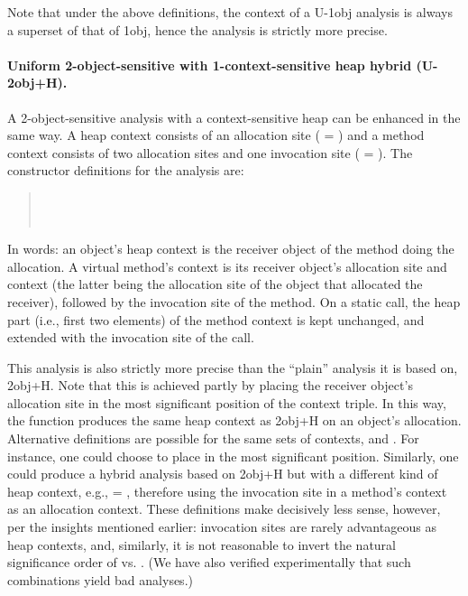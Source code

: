 Note that under the above definitions, the context of a U-1obj
analysis is always a superset of that of 1obj, hence the analysis is
strictly more precise.

\paragraph{Uniform 2-object-sensitive with 1-context-sensitive heap hybrid (U-2obj+H).}

A 2-object-sensitive analysis with a context-sensitive heap can be
enhanced in the same way. A heap context consists of an allocation
site ( = ) and a method context consists of two
allocation sites and one invocation site ( = ).  The constructor definitions for the analysis are:
\begin{quote}
 \\
 \\
\end{quote}
In words: an object's heap context is the receiver object of the
method doing the allocation. A virtual method's context is its
receiver object's allocation site and context (the latter being the
allocation site of the object that allocated the receiver), followed
by the invocation site of the method. On a static call, the heap part
(i.e., first two elements) of the method context is kept unchanged,
and extended with the invocation site of the call.

This analysis is also strictly more precise than the ``plain''
analysis it is based on, 2obj+H. Note that this is achieved partly by
placing the receiver object's allocation site in the most significant
position of the context triple. In this way, the 
function produces the same heap context as 2obj+H on an object's
allocation. Alternative definitions are possible for the same sets of
contexts,  and . For instance, one could choose to
place  in the most significant position. Similarly, one
could produce a hybrid analysis based on 2obj+H but with a different
kind of heap context, e.g.,  = , therefore using the
invocation site in a method's context as an allocation context.  These
definitions make decisively less sense, however, per the insights
mentioned earlier: invocation sites are rarely advantageous as heap
contexts, and, similarly, it is not reasonable to invert the natural
significance order of  vs. . (We have also
verified experimentally that such combinations yield bad analyses.)

